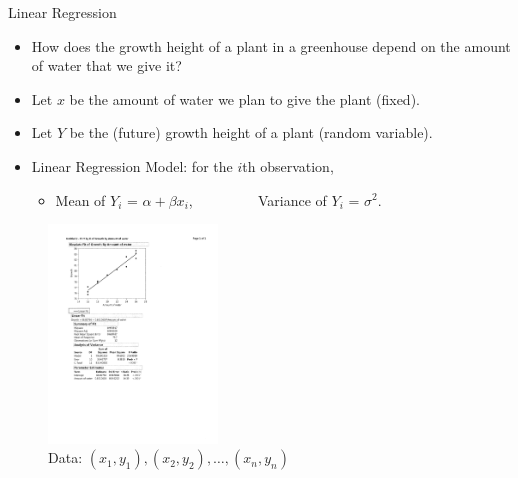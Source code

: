 \documentclass[10pt, xcolor=table]{beamer}
\newcommand*\themecol{\usebeamercolor[fg]{structure}}
\begin{document}
\begin{frame}{Linear Regression}
\begin{itemize}
\setlength{\itemsep}{8pt}
\item How does the growth height of a plant in a greenhouse depend on the amount of water that we give it?
\item Let $x$ be the amount of water we plan to give the plant (fixed).
\item Let $Y$ be the (future) growth height of a plant (random variable).
\item {\themecol Linear Regression Model}: for the $i$th observation,
\vspace{0.25cm}

\begin{itemize}
\setlength{\itemsep}{8pt}
\item Mean of $Y_i$ = $\alpha + \beta x_i$, $\qquad\qquad$ Variance of $Y_i$ = $\sigma^2$.
\end{itemize}
\end{itemize}
\begin{figure}
\includegraphics[width = 0.4\textwidth]{images/rec9_1}
\caption{Data: $(x_1, y_1), (x_2, y_2), \dots, (x_n, y_n)$}
\end{figure}
\end{frame}
\end{document}
